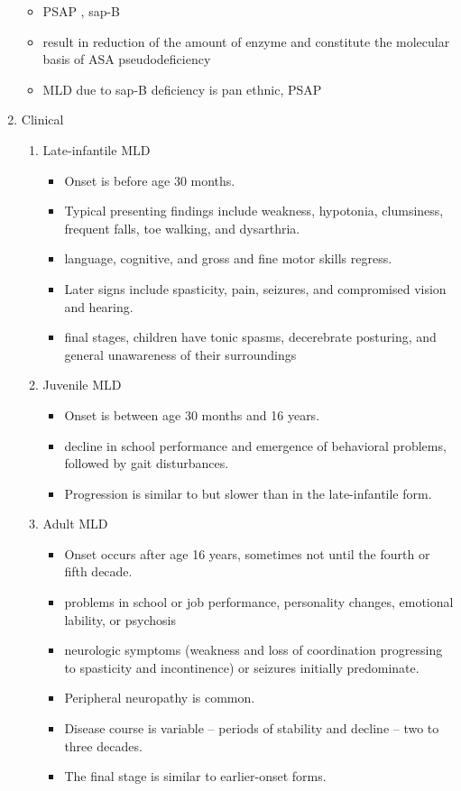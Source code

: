 \documentclass{scrartcl}
\begin{document}
\begin{enumerate}
\begin{itemize}
\item PSAP , sap-B
\item result in reduction of the amount of enzyme and constitute the molecular basis of ASA pseudodeficiency
\item MLD due to sap-B deficiency is pan ethnic, PSAP
\end{itemize}

\item Clinical
\label{sec:org113ed70}
\begin{enumerate}
\item Late-infantile MLD
\label{sec:org88cd0c0}
\begin{itemize}
\item Onset is before age 30 months.
\item Typical presenting findings include weakness, hypotonia, clumsiness, frequent falls, toe walking, and dysarthria.
\item language, cognitive, and gross and fine motor skills regress.
\item Later signs include spasticity, pain, seizures, and compromised vision and hearing.
\item final stages, children have tonic spasms, decerebrate posturing, and
general unawareness of their surroundings
\end{itemize}

\item Juvenile MLD
\label{sec:orgd7d2106}
\begin{itemize}
\item Onset is between age 30 months and 16 years.
\item decline in school performance and emergence of behavioral problems, followed by gait disturbances.
\item Progression is similar to but slower than in the late-infantile form.
\end{itemize}

\item Adult MLD
\label{sec:org00a40ba}
\begin{itemize}
\item Onset occurs after age 16 years, sometimes not until the fourth or fifth decade.
\item problems in school or job performance, personality changes, emotional lability, or psychosis
\item neurologic symptoms (weakness and loss of coordination progressing
to spasticity and incontinence) or seizures initially
predominate.
\item Peripheral neuropathy is common.
\item Disease course is variable – periods of stability and decline – two to three decades.
\item The final stage is similar to earlier-onset forms.
\end{itemize}
\end{enumerate}


\end{enumerate}
\end{document}
